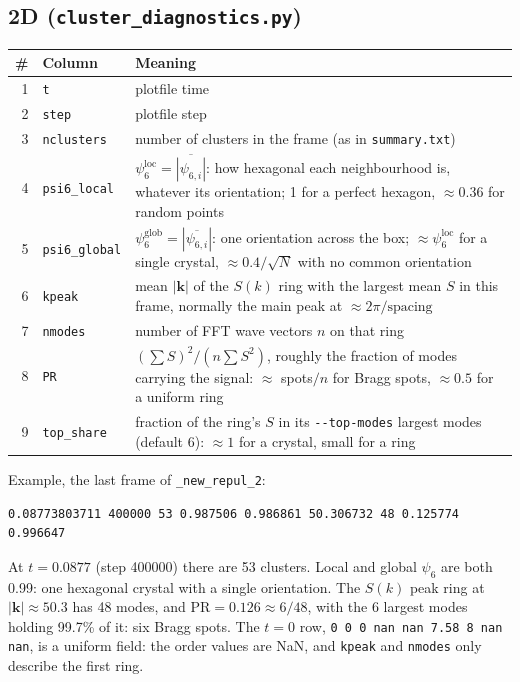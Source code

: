 \documentclass[11pt]{article}
\newcommand{\code}[1]{\texttt{#1}}
\begin{document}
\subsection*{2D (\code{cluster\_diagnostics.py})}
\begin{center}
\begin{tabularx}{\textwidth}{@{}r l L@{}}
\toprule
\# & Column & Meaning \\
 & \code{t} & plotfile time \\
2 & \code{step} & plotfile step \\
3 & \code{nclusters} & number of clusters in the frame (as in \code{summary.txt}) \\
4 & \code{psi6\_local} & $\psi_6^{\mathrm{loc}}=\overline{|\psi_{6,i}|}$: how hexagonal each neighbourhood is, whatever its orientation; 1 for a perfect hexagon, $\approx0.36$ for random points \\
5 & \code{psi6\_global} & $\psi_6^{\mathrm{glob}}=|\overline{\psi_{6,i}}|$: one orientation across the box; $\approx\psi_6^{\mathrm{loc}}$ for a single crystal, $\approx0.4/\sqrt N$ with no common orientation \\
6 & \code{kpeak} & mean $|\mathbf k|$ of the $S(k)$ ring with the largest mean $S$ in this frame, normally the main peak at $\approx2\pi/\text{spacing}$ \\
7 & \code{nmodes} & number of FFT wave vectors $n$ on that ring \\
8 & \code{PR} & $(\sum S)^2/(n\sum S^2)$, roughly the fraction of modes carrying the signal: $\approx$ spots$/n$ for Bragg spots, $\approx0.5$ for a uniform ring \\
9 & \code{top\_share} & fraction of the ring's $S$ in its \code{-{}-top-modes} largest modes (default 6): $\approx1$ for a crystal, small for a ring \\
\bottomrule
\end{tabularx}
\end{center}
Example, the last frame of \code{\_new\_repul\_2}:
\begin{verbatim}
0.08773803711 400000 53 0.987506 0.986861 50.306732 48 0.125774 0.996647
\end{verbatim}
At $t=0.0877$ (step 400000) there are 53 clusters. Local and global $\psi_6$
are both 0.99: one hexagonal crystal with a single orientation. The $S(k)$
peak ring at $|\mathbf k|\approx50.3$ has 48 modes, and $\mathrm{PR}=0.126\approx6/48$,
with the 6 largest modes holding 99.7\% of it: six Bragg spots. The $t=0$ row,
\code{0 0 0 nan nan 7.58 8 nan nan}, is a uniform field: the order values are
NaN, and \code{kpeak} and \code{nmodes} only describe the first ring.
\end{document}
